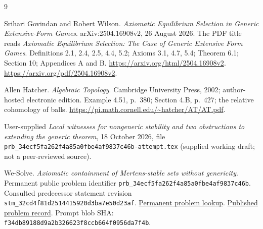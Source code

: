 \documentclass[11pt]{article}
\theoremstyle{definition}
\begin{document}
\begin{thebibliography}{9}
\raggedright
{}
Srihari Govindan and Robert Wilson.
\emph{Axiomatic Equilibrium Selection in Generic Extensive-Form Games}.
arXiv:2504.16908v2, 26 August 2026.
The PDF title reads \emph{Axiomatic Equilibrium Selection: The Case of Generic
Extensive Form Games}.
Definitions 2.1, 2.4, 2.5, 4.4, 5.2; Axioms 3.1, 4.7, 5.4;
Theorem 6.1; Section 10; Appendices A and B.
\url{https://arxiv.org/html/2504.16908v2}.
\url{https://arxiv.org/pdf/2504.16908v2}.

Allen Hatcher.
\emph{Algebraic Topology}.
Cambridge University Press, 2002; author-hosted electronic edition.
Example 4.51, p.~380; Section 4.B, p.~427; the relative cohomology of balls.
\url{https://pi.math.cornell.edu/~hatcher/AT/AT.pdf}.

User-supplied \emph{Local witnesses for nongeneric stability and two
obstructions to extending the generic theorem}, 18 October 2026,
file \texttt{prb\_34ecf5fa262f4a85a0fbe4af9837c46b-attempt.tex} (supplied working draft; not a
peer-reviewed source).

We-Solve.
\emph{Axiomatic containment of Mertens-stable sets without genericity}.
Permanent public problem identifier \texttt{prb\_34ecf5fa262f4a85a0fbe4af9837c46b}.
Consulted predecessor statement revision
\texttt{stm\_32cd4f81d2514415920d3ba7e50d23af}.
\href{https://we-solve.github.io/api/v1/problems/prb_34ecf5fa262f4a85a0fbe4af9837c46b.json}{Permanent problem lookup}.
\href{https://we-solve.github.io/problems/axiomatic-containment-of-mertens-stable-sets-without-genericity/}{Published problem record}.
Prompt blob SHA: \texttt{f34db89188d9a2b326623f8ccb664f0956da7f4b}.
\end{thebibliography}
\end{document}
